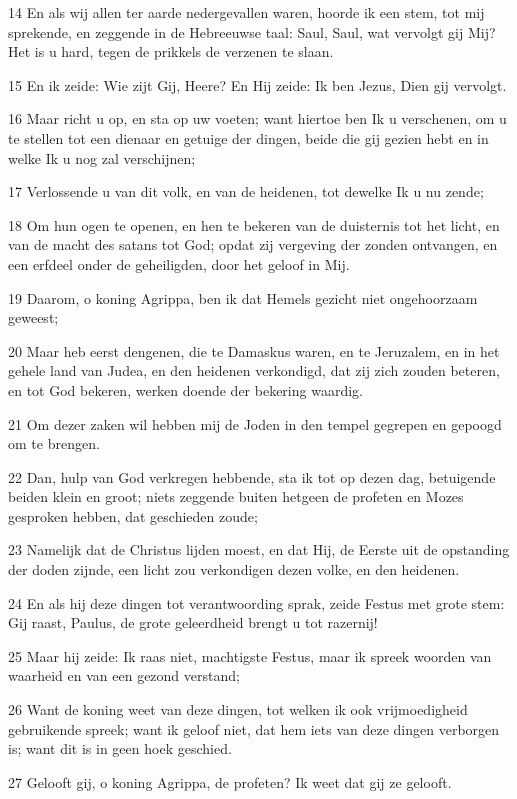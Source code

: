 \par 14 En als wij allen ter aarde nedergevallen waren, hoorde ik een stem, tot mij sprekende, en zeggende in de Hebreeuwse taal: Saul, Saul, wat vervolgt gij Mij? Het is u hard, tegen de prikkels de verzenen te slaan.
\par 15 En ik zeide: Wie zijt Gij, Heere? En Hij zeide: Ik ben Jezus, Dien gij vervolgt.
\par 16 Maar richt u op, en sta op uw voeten; want hiertoe ben Ik u verschenen, om u te stellen tot een dienaar en getuige der dingen, beide die gij gezien hebt en in welke Ik u nog zal verschijnen;
\par 17 Verlossende u van dit volk, en van de heidenen, tot dewelke Ik u nu zende;
\par 18 Om hun ogen te openen, en hen te bekeren van de duisternis tot het licht, en van de macht des satans tot God; opdat zij vergeving der zonden ontvangen, en een erfdeel onder de geheiligden, door het geloof in Mij.
\par 19 Daarom, o koning Agrippa, ben ik dat Hemels gezicht niet ongehoorzaam geweest;
\par 20 Maar heb eerst dengenen, die te Damaskus waren, en te Jeruzalem, en in het gehele land van Judea, en den heidenen verkondigd, dat zij zich zouden beteren, en tot God bekeren, werken doende der bekering waardig.
\par 21 Om dezer zaken wil hebben mij de Joden in den tempel gegrepen en gepoogd om te brengen.
\par 22 Dan, hulp van God verkregen hebbende, sta ik tot op dezen dag, betuigende beiden klein en groot; niets zeggende buiten hetgeen de profeten en Mozes gesproken hebben, dat geschieden zoude;
\par 23 Namelijk dat de Christus lijden moest, en dat Hij, de Eerste uit de opstanding der doden zijnde, een licht zou verkondigen dezen volke, en den heidenen.
\par 24 En als hij deze dingen tot verantwoording sprak, zeide Festus met grote stem: Gij raast, Paulus, de grote geleerdheid brengt u tot razernij!
\par 25 Maar hij zeide: Ik raas niet, machtigste Festus, maar ik spreek woorden van waarheid en van een gezond verstand;
\par 26 Want de koning weet van deze dingen, tot welken ik ook vrijmoedigheid gebruikende spreek; want ik geloof niet, dat hem iets van deze dingen verborgen is; want dit is in geen hoek geschied.
\par 27 Gelooft gij, o koning Agrippa, de profeten? Ik weet dat gij ze gelooft.
